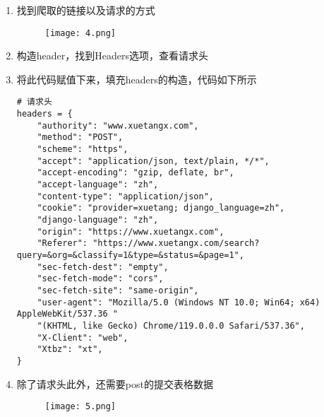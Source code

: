 \documentclass[lang=cn,11pt,a4paper]{elegantpaper}
\begin{document}
\begin{enumerate}
    \item 找到爬取的链接以及请求的方式
    \begin{figure}[!htb]
    \centering
    \texttt{[image: 4.png]}
    \end{figure}
    \item 构造header，找到Headers选项，查看请求头
    \item 将此代码赋值下来，填充headers的构造，代码如下所示
    \begin{lstlisting}
# 请求头
headers = {
    "authority": "www.xuetangx.com",
    "method": "POST",
    "scheme": "https",
    "accept": "application/json, text/plain, */*",
    "accept-encoding": "gzip, deflate, br",
    "accept-language": "zh",
    "content-type": "application/json",
    "cookie": "provider=xuetang; django_language=zh",
    "django-language": "zh",
    "origin": "https://www.xuetangx.com",
    "Referer": "https://www.xuetangx.com/search?query=&org=&classify=1&type=&status=&page=1",
    "sec-fetch-dest": "empty",
    "sec-fetch-mode": "cors",
    "sec-fetch-site": "same-origin",
    "user-agent": "Mozilla/5.0 (Windows NT 10.0; Win64; x64) AppleWebKit/537.36 "
    "(KHTML, like Gecko) Chrome/119.0.0.0 Safari/537.36",
    "X-Client": "web",
    "Xtbz": "xt",
}
    \end{lstlisting}
    \item 除了请求头此外，还需要post的提交表格数据
    \begin{figure}[!htb]
    \centering
    \texttt{[image: 5.png]}
    \end{figure}


\end{enumerate}
\end{document}
